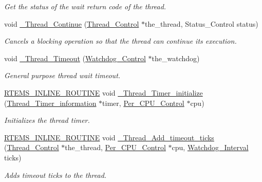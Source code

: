 \begin{DoxyCompactItemize}
\begin{DoxyCompactList}\small\item\em Get the status of the wait return code of the thread. \end{DoxyCompactList}\item 
void \mbox{\hyperlink{group__RTEMSScoreThread_ga0c68c63c9078a21b302b801d351f4721}{\+\_\+\+Thread\+\_\+\+Continue}} (\mbox{\hyperlink{struct__Thread__Control}{Thread\+\_\+\+Control}} $\ast$the\+\_\+thread, Status\+\_\+\+Control status)
\begin{DoxyCompactList}\small\item\em Cancels a blocking operation so that the thread can continue its execution. \end{DoxyCompactList}\item 
void \mbox{\hyperlink{group__RTEMSScoreThread_ga1870eabe77ae0e3913b3888fe4c47185}{\+\_\+\+Thread\+\_\+\+Timeout}} (\mbox{\hyperlink{structWatchdog__Control}{Watchdog\+\_\+\+Control}} $\ast$the\+\_\+watchdog)
\begin{DoxyCompactList}\small\item\em General purpose thread wait timeout. \end{DoxyCompactList}\item 
\mbox{\hyperlink{group__RTEMSScoreBaseDefs_gac216239df231d5dbd15e3520b0b9313f}{R\+T\+E\+M\+S\+\_\+\+I\+N\+L\+I\+N\+E\+\_\+\+R\+O\+U\+T\+I\+NE}} void \mbox{\hyperlink{group__RTEMSScoreThread_gacb988363d243a9c060fdeb9a2cf3d401}{\+\_\+\+Thread\+\_\+\+Timer\+\_\+initialize}} (\mbox{\hyperlink{structThread__Timer__information}{Thread\+\_\+\+Timer\+\_\+information}} $\ast$timer, \mbox{\hyperlink{structPer__CPU__Control}{Per\+\_\+\+C\+P\+U\+\_\+\+Control}} $\ast$cpu)
\begin{DoxyCompactList}\small\item\em Initializes the thread timer. \end{DoxyCompactList}\item 
\mbox{\hyperlink{group__RTEMSScoreBaseDefs_gac216239df231d5dbd15e3520b0b9313f}{R\+T\+E\+M\+S\+\_\+\+I\+N\+L\+I\+N\+E\+\_\+\+R\+O\+U\+T\+I\+NE}} void \mbox{\hyperlink{group__RTEMSScoreThread_ga9f508c3f03d4d52fd2420746ce14fe03}{\+\_\+\+Thread\+\_\+\+Add\+\_\+timeout\+\_\+ticks}} (\mbox{\hyperlink{struct__Thread__Control}{Thread\+\_\+\+Control}} $\ast$the\+\_\+thread, \mbox{\hyperlink{structPer__CPU__Control}{Per\+\_\+\+C\+P\+U\+\_\+\+Control}} $\ast$cpu, \mbox{\hyperlink{group__RTEMSScoreWatchdog_gaa1834fd7531ca9bb5c4ca6fd990388d5}{Watchdog\+\_\+\+Interval}} ticks)
\begin{DoxyCompactList}\small\item\em Adds timeout ticks to the thread. \end{DoxyCompactList}\item 

\end{DoxyCompactItemize}
